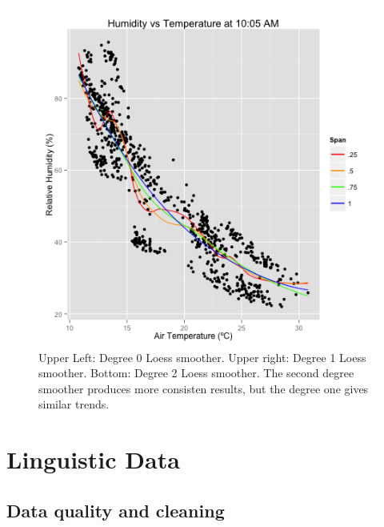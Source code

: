 \documentclass[english]{article}\usepackage{graphicx, color}
\numberwithin{equation}{section}
\numberwithin{figure}{section}
\begin{document}
\begin{figure}
\begin{center}
\includegraphics[scale = .4]{Humidity_Temperature_Loess_2.png}
\end{center}
\caption{Upper Left: Degree 0 Loess smoother. Upper right: Degree 1 Loess smoother. Bottom: Degree 2 Loess smoother. The second degree smoother produces more consisten results, but the degree one gives similar trends.}
\end{figure}

\section{Linguistic Data}

\subsection{Data quality and cleaning}
\end{document}
